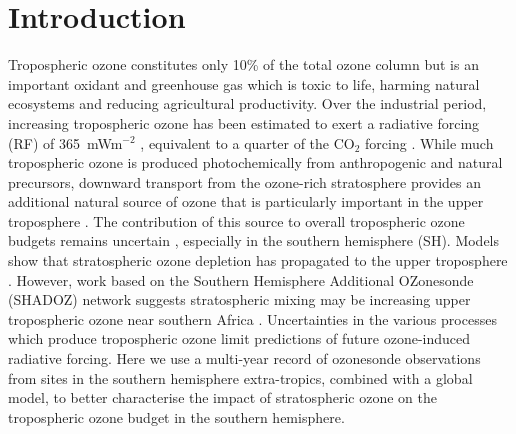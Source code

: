 \section{Introduction}
  Tropospheric ozone constitutes only 10\% of the total ozone column but is an important oxidant and greenhouse gas which is toxic to life, harming natural ecosystems and reducing agricultural productivity.
  Over the industrial period, increasing tropospheric ozone has been estimated to exert a radiative forcing (RF) of 365~mWm$^{-2}$  \parencite{Stevenson2013}, equivalent to a quarter of the CO$_2$ forcing \parencite{IPCC_Chapter2}. 
  While much tropospheric ozone is produced photochemically from anthropogenic and natural precursors, %
  downward transport from the ozone-rich stratosphere provides an additional natural source of ozone that is particularly important in the upper troposphere \parencite[][and references therein]{Jacobson2000}.
  The contribution of this source to overall tropospheric ozone budgets remains uncertain \parencite{Skerlak2014}, especially in the southern hemisphere (SH).
  Models show that stratospheric ozone depletion has propagated to the upper troposphere \parencite{Stevenson2013}. 
  However, work based on the Southern Hemisphere Additional OZonesonde (SHADOZ) network suggests stratospheric mixing may be increasing upper tropospheric ozone near southern Africa \parencite{Liu2015, Thompson2014}.
  Uncertainties in the various processes which produce tropospheric ozone limit predictions of future ozone-induced radiative forcing.
  Here we use a multi-year record of ozonesonde observations from sites in the southern hemisphere extra-tropics, combined with a global model, to better characterise the impact of stratospheric ozone on the tropospheric ozone budget in the southern hemisphere.
  
